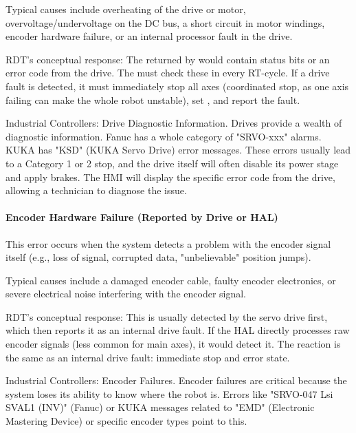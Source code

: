 Typical causes include overheating of the drive or motor, overvoltage/undervoltage on the DC bus, a short circuit in motor windings, encoder hardware failure, or an internal processor fault in the drive.

RDT's conceptual response: The  returned by  would contain status bits or an error code from the drive. The  must check these in every RT-cycle. If a drive fault is detected, it must immediately stop all axes (coordinated stop, as one axis failing can make the whole robot unstable), set , and report the fault.

\begin{principlebox}{Industrial Controllers: Drive Diagnostic Information.}
    Drives provide a wealth of diagnostic information. Fanuc has a whole category of "SRVO-xxx" alarms. KUKA has "KSD" (KUKA Servo Drive) error messages. These errors usually lead to a Category 1 or 2 stop, and the drive itself will often disable its power stage and apply brakes. The HMI will display the specific error code from the drive, allowing a technician to diagnose the issue.
\end{principlebox}

\paragraph{Encoder Hardware Failure (Reported by Drive or HAL)}
This error occurs when the system detects a problem with the encoder signal itself (e.g., loss of signal, corrupted data, "unbelievable" position jumps).

Typical causes include a damaged encoder cable, faulty encoder electronics, or severe electrical noise interfering with the encoder signal.

RDT's conceptual response: This is usually detected by the servo drive first, which then reports it as an internal drive fault. If the HAL directly processes raw encoder signals (less common for main axes), it would detect it. The reaction is the same as an internal drive fault: immediate stop and error state.

\begin{principlebox}{Industrial Controllers: Encoder Failures.}
    Encoder failures are critical because the system loses its ability to know where the robot is. Errors like "SRVO-047 Lsi SVAL1 (INV)" (Fanuc) or KUKA messages related to "EMD" (Electronic Mastering Device) or specific encoder types point to this.
\end{principlebox}

